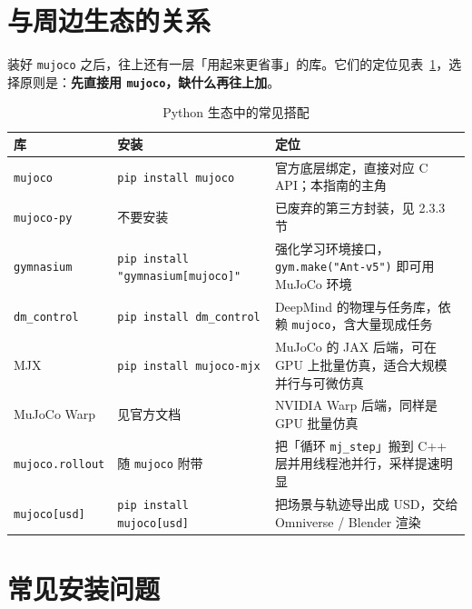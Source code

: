 \section{与周边生态的关系}

装好 \texttt{mujoco} 之后，往上还有一层「用起来更省事」的库。它们的定位见表~\ref{tab:Python:生态}，选择原则是：\textbf{先直接用 \texttt{mujoco}，缺什么再往上加}。

\begin{table}[H]
	\centering
	\caption{Python 生态中的常见搭配}
	\label{tab:Python:生态}
	\footnotesize
	\begin{tabular}{>{\raggedright\arraybackslash}p{2.9cm}>{\raggedright\arraybackslash}p{3.6cm}>{\raggedright\arraybackslash}p{8.0cm}}
		\hline
		库 & 安装 & 定位 \\
		\hline
		\texttt{mujoco} & \texttt{pip install mujoco} & 官方底层绑定，直接对应 C API；本指南的主角 \\
		\texttt{mujoco-py} & 不要安装 & 已废弃的第三方封装，见 2.3.3 节 \\
		\texttt{gymnasium} & \texttt{pip install "gymnasium[mujoco]"} & 强化学习环境接口，\texttt{gym.make("Ant-v5")} 即可用 MuJoCo 环境 \\
		\texttt{dm\_control} & \texttt{pip install dm\_control} & DeepMind 的物理与任务库，依赖 \texttt{mujoco}，含大量现成任务 \\
		MJX & \texttt{pip install mujoco-mjx} & MuJoCo 的 JAX 后端，可在 GPU 上批量仿真，适合大规模并行与可微仿真 \\
		MuJoCo Warp & 见官方文档 & NVIDIA Warp 后端，同样是 GPU 批量仿真 \\
		\texttt{mujoco.rollout} & 随 \texttt{mujoco} 附带 & 把「循环 \texttt{mj\_step}」搬到 C++ 层并用线程池并行，采样提速明显 \\
		\texttt{mujoco[usd]} & \texttt{pip install mujoco[usd]} & 把场景与轨迹导出成 USD，交给 Omniverse / Blender 渲染 \\
		\hline
	\end{tabular}
\end{table}

\section{常见安装问题}

